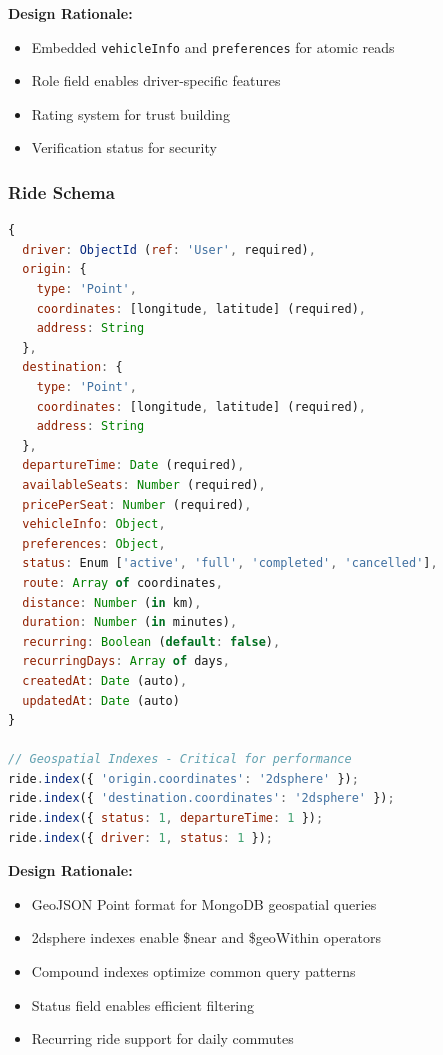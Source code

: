 \documentclass[12pt,a4paper]{article}
\begin{document}
\textbf{Design Rationale:}
\begin{itemize}
    \item Embedded \texttt{vehicleInfo} and \texttt{preferences} for atomic reads
    \item Role field enables driver-specific features
    \item Rating system for trust building
    \item Verification status for security
\end{itemize}

\subsubsection{Ride Schema}
\begin{lstlisting}[language=JavaScript, caption=Ride Model Structure]
{
  driver: ObjectId (ref: 'User', required),
  origin: {
    type: 'Point',
    coordinates: [longitude, latitude] (required),
    address: String
  },
  destination: {
    type: 'Point',
    coordinates: [longitude, latitude] (required),
    address: String
  },
  departureTime: Date (required),
  availableSeats: Number (required),
  pricePerSeat: Number (required),
  vehicleInfo: Object,
  preferences: Object,
  status: Enum ['active', 'full', 'completed', 'cancelled'],
  route: Array of coordinates,
  distance: Number (in km),
  duration: Number (in minutes),
  recurring: Boolean (default: false),
  recurringDays: Array of days,
  createdAt: Date (auto),
  updatedAt: Date (auto)
}

// Geospatial Indexes - Critical for performance
ride.index({ 'origin.coordinates': '2dsphere' });
ride.index({ 'destination.coordinates': '2dsphere' });
ride.index({ status: 1, departureTime: 1 });
ride.index({ driver: 1, status: 1 });
\end{lstlisting}

\textbf{Design Rationale:}
\begin{itemize}
    \item GeoJSON Point format for MongoDB geospatial queries
    \item 2dsphere indexes enable \$near and \$geoWithin operators
    \item Compound indexes optimize common query patterns
    \item Status field enables efficient filtering
    \item Recurring ride support for daily commutes
\end{itemize}
\end{document}
